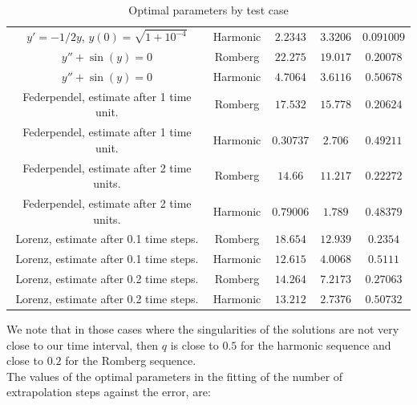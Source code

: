 \begin{table}[H]
\begin{tabular}{c|c||c|c|c}
$y' = -1/2y$, $y(0) = \sqrt{1+10^{-4}}$ & Harmonic & \(2.2343\) & \(3.3206\) & \(0.091009\) \\
$y'' + \sin(y) = 0$ & Romberg & \(22.275\) & \(19.017\) & \(0.20078\) \\
$y'' + \sin(y) = 0$ & Harmonic & \(4.7064\) & \(3.6116\) & \(0.50678\) \\
Federpendel, estimate after 1 time unit. & Romberg & \(17.532\) & \(15.778\) & \(0.20624\) \\
Federpendel, estimate after 1 time unit. & Harmonic & \(0.30737\) & \(2.706\) & \(0.49211\) \\
Federpendel, estimate after 2 time units. & Romberg & \(14.66\) & \(11.217\) & \(0.22272\) \\
Federpendel, estimate after 2 time units. & Harmonic & \(0.79006\) & \(1.789\) & \(0.48379\) \\
Lorenz, estimate after 0.1 time steps. & Romberg & \(18.654\) & \(12.939\) & \(0.2354\) \\
Lorenz, estimate after 0.1 time steps. & Harmonic & \(12.615\) & \(4.0068\) & \(0.5111\) \\
Lorenz, estimate after 0.2 time steps. & Romberg & \(14.264\) & \(7.2173\) & \(0.27063\) \\
Lorenz, estimate after 0.2 time steps. & Harmonic & \(13.212\) & \(2.7376\) & \(0.50732\) \\
    \end{tabular}
    \caption{Optimal parameters by test case}
    \label{tab:my_label}
\end{table}

We note that in those cases where the singularities of the solutions are not very close to our time interval, then \(q\) is close to \(0.5\) for the harmonic sequence and close to \(0.2\) for the Romberg sequence.\\

The values of the optimal parameters in the fitting of the number of extrapolation steps against the error, are:

